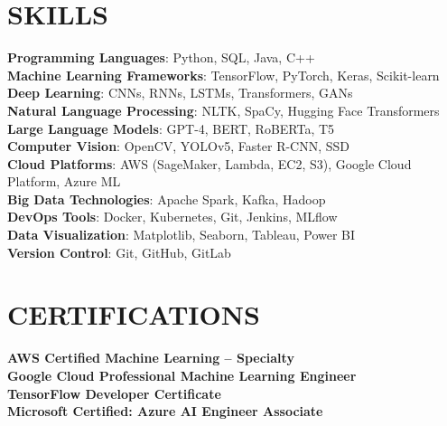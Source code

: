 \documentclass[letterpaper,11pt]{article}
\begin{document}
\section{\textbf{SKILLS}}
 \begin{itemize}[leftmargin=0.15in, label={}]
    \small{\item{
     \textbf{Programming Languages}{: Python, SQL, Java, C++} \\
     \textbf{Machine Learning Frameworks}{: TensorFlow, PyTorch, Keras, Scikit-learn} \\
     \textbf{Deep Learning}{: CNNs, RNNs, LSTMs, Transformers, GANs} \\
     \textbf{Natural Language Processing}{: NLTK, SpaCy, Hugging Face Transformers} \\
     \textbf{Large Language Models}{: GPT-4, BERT, RoBERTa, T5} \\
     \textbf{Computer Vision}{: OpenCV, YOLOv5, Faster R-CNN, SSD} \\
     \textbf{Cloud Platforms}{: AWS (SageMaker, Lambda, EC2, S3), Google Cloud Platform, Azure ML} \\
     \textbf{Big Data Technologies}{: Apache Spark, Kafka, Hadoop} \\
     \textbf{DevOps Tools}{: Docker, Kubernetes, Git, Jenkins, MLflow} \\
     \textbf{Data Visualization}{: Matplotlib, Seaborn, Tableau, Power BI} \\
     \textbf{Version Control}{: Git, GitHub, GitLab}
    }}
 \end{itemize}

\section{\textbf{CERTIFICATIONS}}
 \begin{itemize}[leftmargin=0.15in, label={}]
    \small{\item{
     \textbf{AWS Certified Machine Learning – Specialty} \\
     \textbf{Google Cloud Professional Machine Learning Engineer} \\
     \textbf{TensorFlow Developer Certificate} \\
     \textbf{Microsoft Certified: Azure AI Engineer Associate}
    }}
 \end{itemize}
\end{document}
